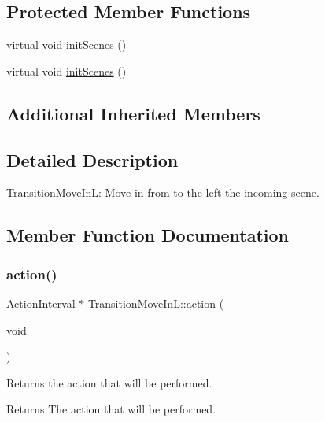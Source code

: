\subsection*{Protected Member Functions}
\begin{DoxyCompactItemize}
\item 
virtual void \hyperlink{classTransitionMoveInL_aeb7630758110537b1098673f21d7d197}{init\+Scenes} ()
\item 
virtual void \hyperlink{classTransitionMoveInL_a12c02b6985e8aa0c4b6edcd5150d7674}{init\+Scenes} ()
\end{DoxyCompactItemize}
\subsection*{Additional Inherited Members}


\subsection{Detailed Description}
\hyperlink{classTransitionMoveInL}{Transition\+Move\+InL}\+: Move in from to the left the incoming scene. 

\subsection{Member Function Documentation}
\mbox{\label{classTransitionMoveInL_ade316ecf0541babff01dc6a69226171d}} 
\subsubsection{\texorpdfstring{action()}{action()}\hspace{0.1cm}{\footnotesize\ttfamily [1/2]}}
{\footnotesize\ttfamily \hyperlink{classActionInterval}{Action\+Interval} $\ast$ Transition\+Move\+In\+L\+::action (\begin{DoxyParamCaption}\item[{void}]{ }\end{DoxyParamCaption})\hspace{0.3cm}{\ttfamily [virtual]}}

Returns the action that will be performed.

\begin{DoxyReturn}{Returns}
The action that will be performed. 
\end{DoxyReturn}
\mbox{\label{classTransitionMoveInL_a2df9a406efaaa265c6996494ddfad304}} 
